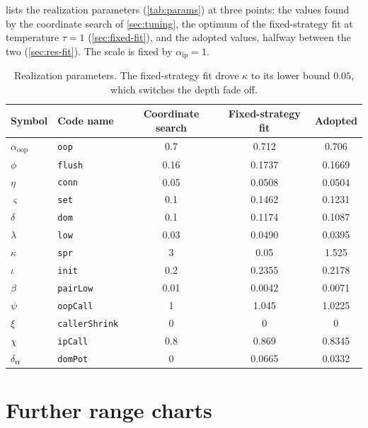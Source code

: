  lists the realization parameters (\cref{tab:params}) at three points: the values found by the coordinate search of \cref{sec:tuning}, the optimum of the fixed-strategy fit at temperature $\tau = 1$ (\cref{sec:fixed-fit}), and the adopted values, halfway between the two (\cref{sec:res-fit}). The scale is fixed by $\alpha_{\mathrm{ip}} = 1$.

\begin{table}[ht]
\centering\small
\begin{tabular}{@{}llS[table-format=1.4]S[table-format=1.4]S[table-format=1.4]@{}}
\toprule
Symbol & Code name & {Coordinate search} & {Fixed-strategy fit} & {Adopted} \\
\midrule
$\alpha_{\mathrm{oop}}$ & \texttt{oop}          & 0.7    & 0.712  & 0.706 \\
$\phi$                  & \texttt{flush}        & 0.16   & 0.1737 & 0.1669 \\
$\eta$                  & \texttt{conn}         & 0.05   & 0.0508 & 0.0504 \\
$\varsigma$             & \texttt{set}          & 0.1    & 0.1462 & 0.1231 \\
$\delta$                & \texttt{dom}          & 0.1    & 0.1174 & 0.1087 \\
$\lambda$               & \texttt{low}          & 0.03   & 0.0490 & 0.0395 \\
$\kappa$                & \texttt{spr}          & 3      & 0.05   & 1.525 \\
$\iota$                 & \texttt{init}         & 0.2    & 0.2355 & 0.2178 \\
$\beta$                 & \texttt{pairLow}      & 0.01   & 0.0042 & 0.0071 \\
$\psi$                  & \texttt{oopCall}      & 1      & 1.045  & 1.0225 \\
$\xi$                   & \texttt{callerShrink} & 0      & 0      & 0 \\
$\chi$                  & \texttt{ipCall}       & 0.8    & 0.869  & 0.8345 \\
$\delta_{\mathrm{rr}}$  & \texttt{domPot}       & 0      & 0.0665 & 0.0332 \\
\bottomrule
\end{tabular}
\caption{Realization parameters. The fixed-strategy fit drove $\kappa$ to its lower bound $0.05$, which switches the depth fade off.}
\label{tab:param-values}
\end{table}

\chapter{Further range charts}\label{app:charts}

